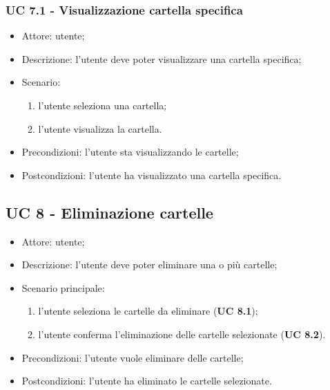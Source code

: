     \subsubsection{UC 7.1 - Visualizzazione cartella specifica}
    \begin{itemize}
        \item Attore: utente;
        \item Descrizione: l'utente deve poter visualizzare una cartella specifica;
        \item Scenario:
        \begin{enumerate}
        \item l'utente seleziona una cartella;
        \item l'utente visualizza la cartella.
        \end{enumerate}
        \item Precondizioni: l'utente sta visualizzando le cartelle;
        \item Postcondizioni: l'utente ha visualizzato una cartella specifica.
    \end{itemize}

    \subsection{UC 8 - Eliminazione cartelle}
    \begin{itemize}
        \item Attore: utente;
        \item Descrizione: l'utente deve poter eliminare una o più cartelle;
        \item Scenario principale:
            \begin{enumerate}
            \item l'utente seleziona le cartelle da eliminare (\textbf{UC 8.1});
            \item l'utente conferma l'eliminazione delle cartelle selezionate (\textbf{UC 8.2}).
            \end{enumerate}
        \item Precondizioni: l'utente vuole eliminare delle cartelle;
        \item Postcondizioni: l'utente ha eliminato le cartelle selezionate.
    \end{itemize}
